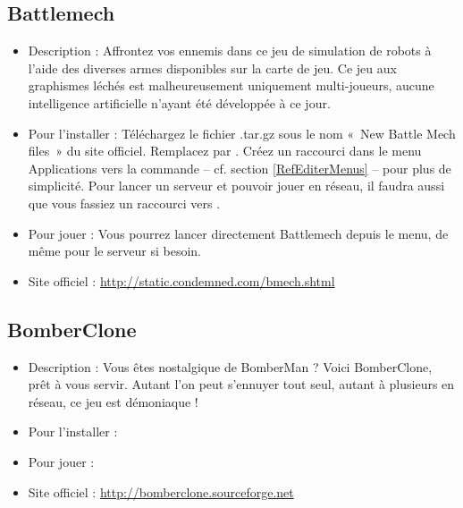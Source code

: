 \subsection{Battlemech}
\begin{itemize}
\begingroup
{}
\item Description : Affrontez vos ennemis dans ce jeu de simulation de robots à l'aide des diverses armes disponibles sur la carte de jeu. Ce jeu aux graphismes léchés est malheureusement uniquement multi-joueurs, aucune intelligence artificielle n'ayant été développée à ce jour.{\par}
\endgroup
\item Pour l'installer : Téléchargez le fichier .tar.gz sous le nom «~New Battle Mech files~» du site officiel. Remplacez  par . Créez un raccourci dans le menu Applications vers la commande  -- cf. section \ref{RefEditerMenus} -- pour plus de simplicité. Pour lancer un serveur et pouvoir jouer en réseau, il faudra aussi que vous fassiez un raccourci vers .{\par}
\item Pour jouer : Vous pourrez lancer directement Battlemech depuis le menu, de même pour le serveur si besoin.{\par}
\item Site officiel : \url{http://static.condemned.com/bmech.shtml}{\par}
\end{itemize}
\subsection{BomberClone}
\begin{itemize}
\begingroup
{}
\item Description : Vous êtes nostalgique de BomberMan ? Voici BomberClone, prêt à vous servir. Autant l'on peut s'ennuyer tout seul, autant à plusieurs en réseau, ce jeu est démoniaque !{\par}
\item Pour l'installer : 
\item Pour jouer : 
\item Site officiel : \url{http://bomberclone.sourceforge.net}{\par}
\endgroup
\end{itemize}
